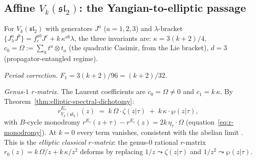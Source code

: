 \subsection{Affine $V_k(\mathfrak{sl}_2)$:
 the Yangian-to-elliptic passage}%
\label{subsec:affine-genus1-endomorphism}

\begin{computation}%
\label{comp:affine-sl2-genus1-endomorphism}%
%
%
%
For $V_k(\mathfrak{sl}_2)$ with generators
$J^a$ ($a = 1,2,3$) and $\lambda$-bracket
$\{J^a_\lambda J^b\} = f^{ab}_c J^c + k\,\kappa^{ab}\lambda$,
the three invariants are:
$\kappa = 3(k+2)/4$,
$c_0 = \Omega := \sum_a t^a \otimes t_a$ \textup{(}the
quadratic Casimir, from the Lie bracket\textup{)},
$d = 3$ \textup{(}propagator-entangled regime\textup{)}.

\smallskip
\noindent
\emph{Period correction.}
$F_1 = 3(k+2)/96 = (k+2)/32$.

\smallskip
\noindent
\emph{Genus-$1$ $r$-matrix.}
The Laurent coefficients are $c_0 = \Omega \ne 0$
and $c_1 = k\,\kappa$. By
Theorem~\ref{thm:elliptic-spectral-dichotomy}:
\begin{equation}\label{eq:affine-genus1-rmatrix}
r^{E_\tau}_{V_k(\mathfrak{sl}_2)}(z)
\;=\;
k\,\Omega \cdot \zeta(z|\tau)
\;+\;
k\,\kappa \cdot \wp(z|\tau),
\end{equation}
with $B$-cycle monodromy
$r^{E_\tau}(z + \tau) - r^{E_\tau}(z) = 2k\,\eta_\tau \cdot \Omega$
(equation~\eqref{eq:r-monodromy}). At $k = 0$ every
term vanishes, consistent with the abelian limit
. This is the
\emph{elliptic classical $r$-matrix}: the genus-$0$
rational $r$-matrix $r_0(z) = k\,\Omega/z + k\,\kappa/z^2$
deforms by replacing $1/z \leadsto \zeta(z|\tau)$ and
$1/z^2 \leadsto \wp(z|\tau)$.


\end{computation}
